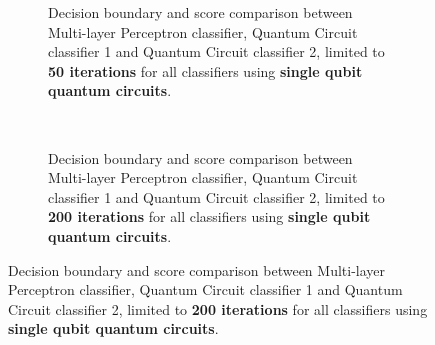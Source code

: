 \begin{figure}[h!]
    \centering
    
    \begin{subfigure}{1.0\textwidth}
        \centering
        \caption{Decision boundary and score comparison between Multi-layer Perceptron classifier, Quantum Circuit classifier 1 and Quantum Circuit classifier 2, limited to \textbf{50 iterations} for all classifiers using \textbf{single qubit quantum circuits}.}
        \label{fig:SingleQubitClassifiers_50Iterations}
    \end{subfigure}
    \\[2ex]
    \begin{subfigure}{1.0\textwidth}
        \centering
        \caption{Decision boundary and score comparison between Multi-layer Perceptron classifier, Quantum Circuit classifier 1 and Quantum Circuit classifier 2, limited to \textbf{200 iterations} for all classifiers using \textbf{single qubit quantum circuits}.}
        \label{fig:SingleQubitClassifiers_200Iterations}

\end{subfigure}
\end{figure}
